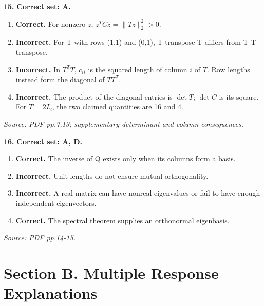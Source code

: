 \documentclass[11pt,a4paper]{article}
\begin{document}
\par\noindent\begin{minipage}{\linewidth}
\textbf{15.} \textbf{Correct set: A.}
\begin{enumerate}[label=(\Alph*),leftmargin=8mm,itemsep=2pt,topsep=2pt]
\item \textbf{Correct.} For nonzero \(z\), \(z^TCz=\|Tz\|_2^2>0\).
\item \textbf{Incorrect.} For T with rows (1,1) and (0,1), T transpose T differs from T T transpose.
\item \textbf{Incorrect.} In \(T^TT\), \(c_{ii}\) is the squared length of column \(i\) of \(T\). Row lengths instead form the diagonal of \(TT^T\).
\item \textbf{Incorrect.} The product of the diagonal entries is \(\det T\); \(\det C\) is its square. For \(T=2I_2\), the two claimed quantities are 16 and 4.
\end{enumerate}
{\footnotesize\textit{Source: PDF pp.7,13; supplementary determinant and column consequences.}}

\end{minipage}\par\vspace{3mm}
\par\noindent\begin{minipage}{\linewidth}
\textbf{16.} \textbf{Correct set: A, D.}
\begin{enumerate}[label=(\Alph*),leftmargin=8mm,itemsep=2pt,topsep=2pt]
\item \textbf{Correct.} The inverse of Q exists only when its columns form a basis.
\item \textbf{Incorrect.} Unit lengths do not ensure mutual orthogonality.
\item \textbf{Incorrect.} A real matrix can have nonreal eigenvalues or fail to have enough independent eigenvectors.
\item \textbf{Correct.} The spectral theorem supplies an orthonormal eigenbasis.
\end{enumerate}
{\footnotesize\textit{Source: PDF pp.14-15.}}

\end{minipage}\par\vspace{3mm}
\newpage\section*{Section B. Multiple Response --- Explanations}
\end{document}
